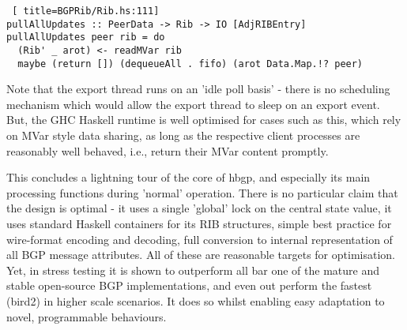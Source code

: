 \begin{lstlisting} [ title=BGPRib/Rib.hs:111]
pullAllUpdates :: PeerData -> Rib -> IO [AdjRIBEntry]
pullAllUpdates peer rib = do
  (Rib' _ arot) <- readMVar rib
  maybe (return []) (dequeueAll . fifo) (arot Data.Map.!? peer)
\end{lstlisting}

Note that the export thread runs on an 'idle poll basis' - there is no scheduling mechanism which would allow the export thread to sleep on an export event.  But, the GHC Haskell runtime is well optimised for cases such as this, which rely on MVar style data sharing, as long as the respective client processes are reasonably well behaved, i.e., return their MVar content promptly.

\bigskip

This concludes a lightning tour of the core of hbgp, and especially its main processing functions during 'normal' operation.  There is no particular claim that the design is optimal - it uses a single 'global' lock on the central state value, it uses standard Haskell containers for its RIB structures, simple best practice for wire-format encoding and decoding, full conversion to internal representation of all BGP message attributes.  All of these are reasonable targets for optimisation.  Yet, in stress testing it is shown to outperform all bar one of the mature and stable open-source BGP implementations, and even out perform the fastest (bird2) in higher scale scenarios.   It does so whilst enabling easy adaptation to novel, programmable behaviours.







